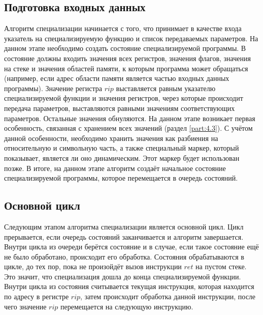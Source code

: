\subsection{ Подготовка входных данных}
Алгоритм специализации начинается с того, что принимает в качестве входа указатель на специализируемую функцию и список передаваемых параметров. На данном этапе необходимо создать состояние специализируемой программы. В состояние должны входить значения всех регистров, значения флагов, значения на стеке и значения областей памяти, к которым программа может обращаться (например, если адрес области памяти является частью входных данных программы). Значение регистра $rip$ выставляется равным указателю специализируемой функции и значения регистров, через которые происходит передача параметров, выставляются равными значениям соответствующих параметров. Остальные значения обнуляются. На данном этапе возникает первая особенность, связанная с хранением всех значений (раздел \ref{part:4.3}).
С учётом данной особенности, необходимо хранить значения как разбиения на относительную и символьную часть, а также специальный маркер, который показывает, является ли оно динамическим. Этот маркер будет использован позже. В итоге, на данном этапе алгоритм создаёт начальное состояние специализируемой программы, которое перемещается в очередь состояний.

\subsection{Основной цикл}
Следующим этапом алгоритма специализации является основной цикл. Цикл прерывается, если очередь состояний заканчивается и алгоритм завершается. Внутри цикла из очереди берётся состояние и в случае, если такое состояние ещё не было обработано, происходит его обработка. Состояния обрабатываются в цикле, до тех пор, пока не произойдёт вызов инструкции $ret$ на пустом стеке. Это значит, что специализация дошла до конца специализируемой функции. Внутри цикла из состояния считывается текущая инструкция, которая находится по адресу в регистре $rip$, затем происходит обработка данной инструкции, после чего значение $rip$ перемещается на следующую инструкцию.

